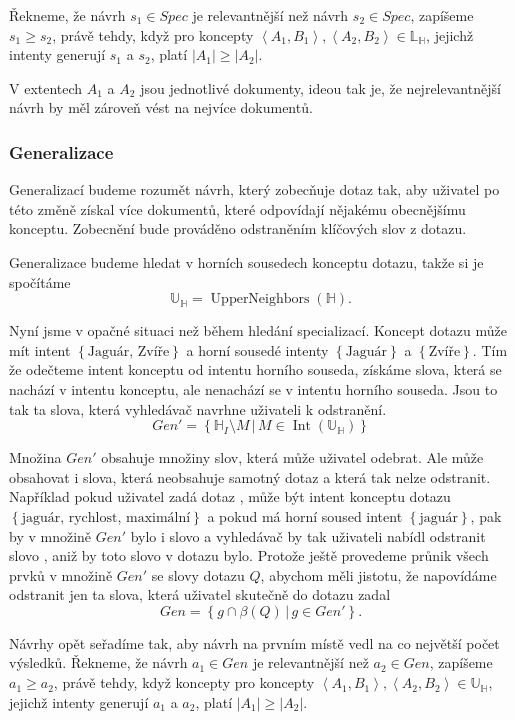 \documentclass[12pt]{article}
\newcommand{\sep}{\,|\,}
\newcommand{\sssection}[1]{\subsubsection{#1}}
\newcommand{\adds}[1]{\left\{#1\right\}}
\newcommand{\addsp}[1]{\left<#1\right>}
\DeclareMathOperator{\intfca}{Int}
\DeclareMathOperator{\upperneighbors}{UpperNeighbors}
\newcommand{\hledany}{\mathbb{H}}
\newcommand{\lowerc}{\mathbb{L}}
\newcommand{\upperc}{\mathbb{U}}
\begin{document}
Řekneme, že návrh $s_1 \in Spec$ je relevantnější než návrh $s_2 \in Spec$, zapíšeme $s_1 \ge s_2$, právě tehdy, když pro koncepty $\addsp{A_1, B_1}, \addsp{A_2, B_2} \in \lowerc_\hledany$, jejichž intenty generují $s_1$ a $s_2$, platí $|A_1|\ge|A_2|$. 

V extentech $A_1$ a $A_2$ jsou jednotlivé dokumenty, ideou tak je, že nejrelevantnější návrh by měl zároveň vést na nejvíce dokumentů. 

\sssection{Generalizace}
Generalizací budeme rozumět návrh, který zobecňuje dotaz tak, aby uživatel po této změně získal více dokumentů, které odpovídají nějakému obecnějšímu konceptu. Zobecnění bude prováděno odstraněním klíčových slov z dotazu. 

Generalizace budeme hledat v horních sousedech konceptu dotazu, takže si je spočítáme
$$
\upperc_\hledany=\upperneighbors(\hledany).
$$

Nyní jsme v opačné situaci než během hledání specializací. Koncept dotazu může mít intent $\adds{\mbox{Jaguár, Zvíře}}$ a horní sousedé intenty $\adds{\mbox{Jaguár}}$ a $\adds{\mbox{Zvíře}}$. Tím že odečteme intent konceptu od intentu horního souseda, získáme slova, která se nachází v intentu konceptu, ale nenachází se v intentu horního souseda. Jsou to tak ta slova, která vyhledávač navrhne uživateli k odstranění. 
$$
Gen'=\adds{\hledany_I\setminus M\sep M\in\intfca(\upperc_\hledany)}
$$

Množina $Gen'$ obsahuje množiny slov, která může uživatel odebrat. Ale může obsahovat i slova, která neobsahuje samotný dotaz a která tak nelze odstranit. Například pokud uživatel zadá dotaz , může být intent konceptu dotazu $\adds{\mbox{jaguár, rychlost, maximální}}$ a pokud má horní soused intent $\adds{\mbox{jaguár}}$, pak by v množině $Gen'$ bylo i slovo  a vyhledávač by tak uživateli nabídl odstranit slovo , aniž by toto slovo v dotazu bylo. Protože ještě provedeme průnik všech prvků v množině $Gen'$ se slovy dotazu $Q$, abychom měli jistotu, že napovídáme odstranit jen ta slova, která uživatel skutečně do dotazu zadal
$$
Gen=\adds{g\cap\beta(Q)\sep g\in Gen'}.
$$

Návrhy opět seřadíme tak, aby návrh na prvním místě vedl na co největší počet výsledků. Řekneme, že návrh $a_1\in Gen$ je relevantnější než $a_2\in Gen$, zapíšeme $a_1\ge a_2$, právě tehdy, když koncepty pro koncepty $\addsp{A_1, B_1}, \addsp{A_2, B_2} \in \upperc_\hledany$, jejichž intenty generují $a_1$ a $a_2$, platí $|A_1|\ge|A_2|$. 
\end{document}
